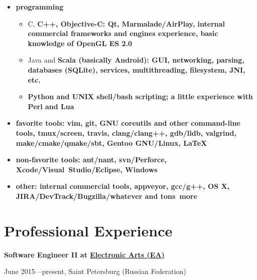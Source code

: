 \begin{itemize}

\item \bfseries programming\mdseries

    \begin{itemize}
    \item C, \bfseries C++\mdseries, Objective-C:
    \bfseries Qt\mdseries, Marmalade/AirPlay, internal commercial frameworks and engines experience, basic knowledge of OpenGL ES 2.0


    \item Java and \bfseries Scala \mdseries (basically \bfseries Android\mdseries):
    GUI, networking, parsing, databases (SQLite), services, multithreading, filesystem, JNI, etc.


    \item \bfseries Python \mdseries and UNIX \bfseries shell/bash \mdseries scripting;
    a little experience with Perl and Lua

    \end{itemize}

\item \bfseries favorite tools\mdseries:
vim, \bfseries git\mdseries, GNU coreutils and other command-line tools, tmux/screen, travis,
clang/clang++, gdb/lldb, valgrind, make/cmake/qmake/sbt, \bfseries Gentoo \mdseries GNU/Linux, \LaTeX
\item \bfseries non-favorite tools\mdseries: ant/nant, svn/Perforce, Xcode/Visual~Studio/Eclipse, Windows
\item \bfseries other\mdseries: internal commercial tools, appveyor, gcc/g++, OS X, JIRA/DevTrack/Bugzilla/whatever and \bfseries tons~\mdseries more

\end{itemize}

\section*{Professional Experience}
{
\fontsize{12pt}{12pt}\selectfont
\bfseries Software Engineer II at
\href{http://www.ea.com}{Electronic Arts (EA)}
\mdseries
}

{
\fontsize{9pt}{8pt}\selectfont
June 2015---present, Saint Petersburg (Russian Federation)
}
\vspace{5pt}

